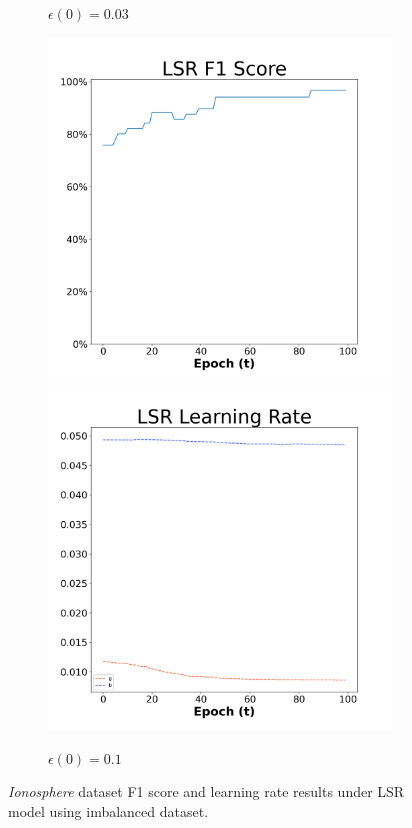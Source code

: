 \begin{figure}[H]
\begin{subfigure}{0.3\textwidth}
  \caption{$\epsilon(0)=0.03$}
\end{subfigure}\hfil %
\begin{subfigure}{0.3\textwidth}
  \includegraphics[width=\linewidth]{images/exper2/Ionosphere/LSR_0.1_f1.png}
  \includegraphics[width=\linewidth]{images/exper2/Ionosphere/LSR_0.1_lr.png}
  \caption{$\epsilon(0)=0.1$}\label{2ionlsr1}
\end{subfigure}

\caption{\textit{Ionosphere} dataset F1 score and learning rate results under LSR model using imbalanced dataset.}
\end{figure}

